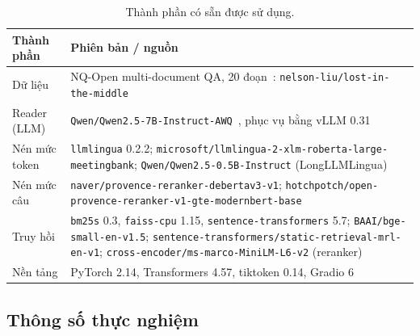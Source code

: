 \begin{table}[!ht]
\centering
\caption{Thành phần có sẵn được sử dụng.}
\label{tab:libs}
\small
\renewcommand{\arraystretch}{1.15}
\begin{tabularx}{\linewidth}{@{}l X@{}}
\toprule
Thành phần & Phiên bản / nguồn \\
\midrule
Dữ liệu & NQ-Open multi-document QA, 20 đoạn~\cite{liu2024lost}:
  \texttt{\footnotesize nelson-liu/lost-in-the-middle} \\
Reader (LLM) & \texttt{\footnotesize Qwen/Qwen2.5-7B-Instruct-AWQ}~\cite{qwen2025qwen25,lin2024awq},
  phục vụ bằng vLLM 0.31~\cite{kwon2023vllm} \\
Nén mức token & \texttt{llmlingua} 0.2.2;\newline
  \texttt{\footnotesize microsoft/llmlingua-2-xlm-roberta-large-meetingbank};\newline
  \texttt{\footnotesize Qwen/Qwen2.5-0.5B-Instruct} (LongLLMLingua) \\
Nén mức câu & \texttt{\footnotesize naver/provence-reranker-debertav3-v1};\newline
  \texttt{\footnotesize hotchpotch/open-provence-reranker-v1-gte-modernbert-base} \\
Truy hồi & \texttt{bm25s} 0.3, \texttt{faiss-cpu} 1.15, \texttt{sentence-transformers} 5.7;\newline
  \texttt{\footnotesize BAAI/bge-small-en-v1.5};\newline
  \texttt{\footnotesize sentence-transformers/static-retrieval-mrl-en-v1};\newline
  \texttt{\footnotesize cross-encoder/ms-marco-MiniLM-L6-v2} (reranker) \\
Nền tảng & PyTorch 2.14, Transformers 4.57, tiktoken 0.14, Gradio 6 \\
\bottomrule
\end{tabularx}
\end{table}

\subsection{Thông số thực nghiệm}

